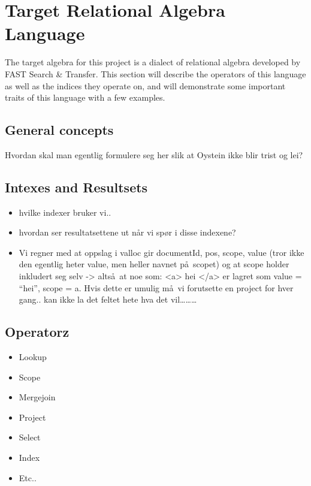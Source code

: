\section{Target Relational Algebra Language}
The target algebra for this project is a dialect of relational algebra
developed by FAST Search \& Transfer. This section will describe the operators
of this language as well as the indices they operate on, and will demonstrate some 
important traits of this language with a few examples.

\subsection{General concepts}
Hvordan skal man egentlig formulere seg her slik at Oystein ikke blir trist og
lei?

\subsection{Intexes and Resultsets}
\begin{itemize}
  \item hvilke indexer bruker vi..
  \item hvordan ser resultatsettene ut n\aa r vi sp\o r i disse indexene?
  \item Vi regner med at oppslag i valloc gir {documentId, pos, scope, value} (tror ikke den egentlig heter value,
  men heller navnet p\aa~scopet) og at scope holder inkludert seg selv -> alts\aa~at noe som: <a> hei </a> er
  lagret som {value = ``hei'', scope = a}. Hvis dette er umulig m\aa~vi forutsette en project for hver gang.. kan
  ikke la det feltet hete hva det vil\ldots\ldots\ldots
\end{itemize}


\subsection{Operatorz}
\label{sect:method:marsOperators}

\begin{itemize}
  \item Lookup
  \item Scope
  \item Mergejoin
  \item Project
  \item Select
  \item Index
  \item Etc..
\end{itemize}

